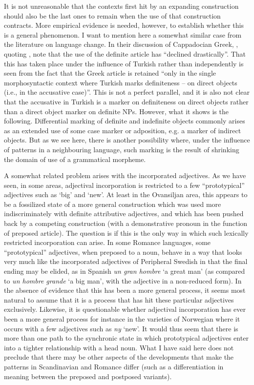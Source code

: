 It is not unreasonable that the contexts first hit by an expanding construction should also be the last ones to remain when the use of that construction contracts. More empirical evidence is needed, however, to establish whether this is a general phenomenon. I want to mention here a somewhat similar case from the literature on language change. In their discussion of Cappadocian Greek, \citet{ThomasonEtAl1988}, quoting \citet{Dawkins1916}, note that the use of the definite article has “declined drastically”. That this has taken place under the influence of Turkish rather than independently is seen from the fact that the Greek article is retained “only in the single morphosyntactic context where Turkish marks definiteness – on direct objects (i.e., in the accusative case)”. This is not a perfect parallel, and it is also not clear that the accusative in Turkish is a marker on definiteness on direct objects rather than a direct object marker on definite NPs. However, what it shows is the following. Differential marking of definite and indefinite objects commonly arises as an extended use of some case marker or adposition, e.g. a marker of indirect objects. But as we see here, there is another possibility where, under the influence of patterns in a neighbouring language, such marking is the result of shrinking the domain of use of a grammatical morpheme. 

A somewhat related problem arises with the incorporated adjectives. As we have seen, in some areas, adjectival incorporation is restricted to a few “prototypical” adjectives such as ‘big’ and ‘new’. At least in the Ovansiljan area, this appears to be a fossilized state of a more general construction which was used more indiscriminately with definite attributive adjectives, and which has been pushed back by a competing construction (with a demonstrative pronoun in the function of preposed article). The question is if this is the only way in which such lexically restricted incorporation can arise. In some Romance languages, some “prototypical” adjectives, when preposed to a noun, behave in a way that looks very much like the incorporated adjectives of Peripheral Swedish in that the final ending may be elided, as in Spanish \textit{un gran hombre} ‘a great man’ (as compared to \textit{un hombre grande }‘a big man’, with the adjective in a non-reduced form). In the absence of evidence that this has been a more general process, it seems most natural to assume that it is a process that has hit these particular adjectives exclusively. Likewise, it is questionable whether adjectival incorporation has ever been a more general process for instance in the varieties of Norwegian where it occurs with a few adjectives such as \textit{ny} ‘new’. It would thus seem that there is more than one path to the synchronic state in which prototypical adjectives enter into a tighter relationship with a head noun. What I have said here does not preclude that there may be other aspects of the developments that make the patterns in Scandinavian and Romance differ (such as a differentiation in meaning between the preposed and postposed variants). 

